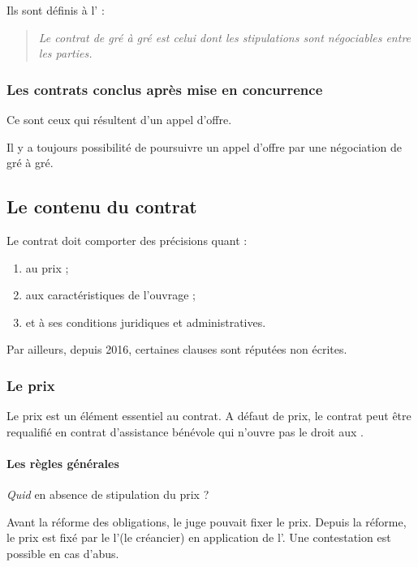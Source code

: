 			Ils sont définis à l' :
			\begin{quote}
				\itshape Le contrat de gré à gré est celui dont les stipulations sont négociables entre les parties. \lips
			\end{quote}

			\subsubsection{Les contrats conclus après mise en concurrence}

			Ce sont ceux qui résultent d'un appel d'offre.

			Il y a toujours possibilité de poursuivre un appel d'offre par une négociation de gré à gré.

		\subsection{Le contenu du contrat}

			Le contrat doit comporter des précisions quant :
			\begin{enumerate}
				\item au prix ;
				\item aux caractéristiques de l'ouvrage ;
				\item et à ses conditions juridiques et administratives.
			\end{enumerate}
			Par ailleurs, depuis 2016, certaines clauses sont réputées non écrites.

			\subsubsection{Le prix}

				Le prix est un élément essentiel au contrat. A défaut de prix, le contrat peut être requalifié en contrat d'assistance bénévole qui n'ouvre pas le droit aux \garSpec.

				\paragraph{Les règles générales}

				\emph{Quid} en absence de stipulation du prix ?

				Avant la réforme des obligations, le juge pouvait fixer le prix. Depuis la réforme, le prix est fixé par le l'\E (le créancier) en application de l'. Une contestation est possible en cas d'abus.

